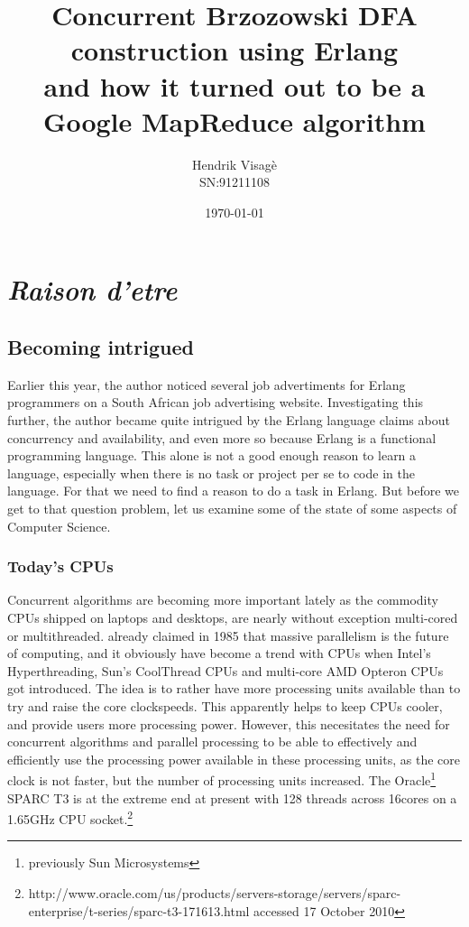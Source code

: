 \documentclass[a4paper,11pt]{report}
\author{Hendrik Visag\`e\\SN:91211108}
\title{Concurrent Brzozowski
	DFA construction using Erlang
 \\\small{and how it turned out to be a
		Google MapReduce algorithm}}
\date{\today}
\begin{document}


\maketitle

\chapter{\textit{Raison d'etre}}

\section{Becoming intrigued}

Earlier this year, the author noticed several job advertiments for
Erlang programmers on a South African job advertising
website. Investigating this further, the author became quite intrigued
by the Erlang language claims about concurrency and availability, and
even more so because Erlang is a functional programming language. This
alone is not a good enough reason to learn a language, especially when
there is no task or project per se to code in the language. For that
we need to find a reason to do a task in Erlang. But before we get to
that question problem, let us examine some of the state of some
aspects of Computer Science.

\subsection{Today's CPUs}
Concurrent algorithms are becoming more important lately as the
commodity CPUs shipped on laptops and desktops, are nearly without
exception multi-cored or multithreaded. \cite{ActorModel} already
claimed in 1985 that massive parallelism is the future of computing,
and it obviously have become a trend with CPUs when Intel's
Hyperthreading, Sun's CoolThread
CPUs and multi-core AMD Opteron CPUs got introduced.
The idea is to rather have
more processing units available than to try and raise the core
clockspeeds. This apparently helps to keep CPUs cooler, and provide users more
processing power. However, this necesitates the need for concurrent
algorithms and parallel processing to be able to effectively and
efficiently use the processing power available in these processing
units, as the core clock is not faster, but the number of processing
units increased.
The Oracle\footnote{previously Sun Microsystems} SPARC T3 is at the
extreme end at present with 128 threads across 16cores on a 1.65GHz
CPU
socket.\footnote{http://www.oracle.com/us/products/servers-storage/servers/sparc-enterprise/t-series/sparc-t3-171613.html
accessed 17 October 2010}
\end{document}
